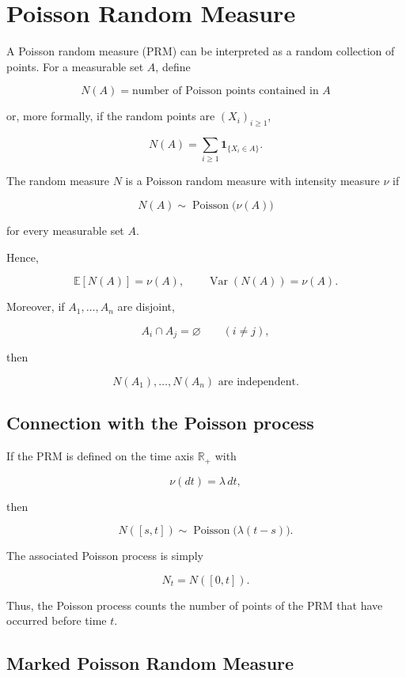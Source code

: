\documentclass{article}
\begin{document}
\section{Poisson Random Measure}

A Poisson random measure (PRM) can be interpreted as a random collection
of points. For a measurable set $A$, define

\[
\boxed{
N(A)
=
\text{number of Poisson points contained in }A
}
\]

or, more formally, if the random points are $(X_i)_{i\geq1}$,

\[
\boxed{
N(A)
=
\sum_{i\geq1}\mathbf{1}_{\{X_i\in A\}}.
}
\]

The random measure $N$ is a Poisson random measure with intensity measure
$\nu$ if

\[
\boxed{
N(A)\sim\operatorname{Poisson}\bigl(\nu(A)\bigr)
}
\]

for every measurable set $A$.

Hence,

\[
\mathbb{E}[N(A)] = \nu(A),
\qquad
\operatorname{Var}(N(A)) = \nu(A).
\]

Moreover, if $A_1,\ldots,A_n$ are disjoint,

\[
A_i\cap A_j=\varnothing
\qquad (i\neq j),
\]

then

\[
\boxed{
N(A_1),\ldots,N(A_n)
\text{ are independent}.
}
\]

\subsection{Connection with the Poisson process}

If the PRM is defined on the time axis $\mathbb{R}_+$ with

\[
\boxed{
\nu(dt)=\lambda\,dt,
}
\]

then

\[
N([s,t])
\sim
\operatorname{Poisson}\bigl(\lambda(t-s)\bigr).
\]

The associated Poisson process is simply

\[
\boxed{
N_t=N([0,t]).
}
\]

Thus, the Poisson process counts the number of points of the PRM
that have occurred before time $t$.

\subsection{Marked Poisson Random Measure}
\end{document}
